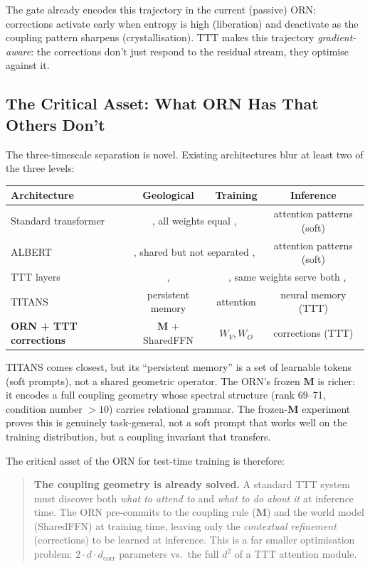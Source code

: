 \documentclass[11pt, a4paper]{article}
\newcommand{\M}{\mathbf{M}}
\theoremstyle{plain}
\theoremstyle{definition}
\theoremstyle{remark}
\begin{document}
The gate already encodes this trajectory in the current (passive) ORN: corrections activate early when entropy is high (liberation) and deactivate as the coupling pattern sharpens (crystallisation).
TTT makes this trajectory \emph{gradient-aware}: the corrections don't just respond to the residual stream, they optimise against it.

\subsection{The Critical Asset: What ORN Has That Others Don't}
\label{sec:critical-asset}

The three-timescale separation is novel.
Existing architectures blur at least two of the three levels:

\begin{center}\small
\begin{tabular}{lccc}
\toprule
\textbf{Architecture} & \textbf{Geological} & \textbf{Training} & \textbf{Inference} \\
\midrule
Standard transformer & \multicolumn{2}{c}{,  all weights equal , } & attention patterns (soft) \\
ALBERT~\cite{dehghani2018universal} & \multicolumn{2}{c}{,  shared but not separated , } & attention patterns (soft) \\
TTT layers~\cite{sun2024ttt} & ,  & \multicolumn{2}{c}{,  same weights serve both , } \\
TITANS~\cite{behrouz2025titans} & persistent memory & attention & neural memory (TTT) \\
\textbf{ORN + TTT corrections} & $\M$ + SharedFFN & $W_V, W_O$ & corrections (TTT) \\
\bottomrule
\end{tabular}
\end{center}

TITANS comes closest, but its ``persistent memory'' is a set of learnable tokens (soft prompts), not a shared geometric operator.
The ORN's frozen $\M$ is richer: it encodes a full coupling geometry whose spectral structure (rank 69--71, condition number $> 10$) carries relational grammar.
The frozen-$\M$ experiment proves this is genuinely task-general, not a soft prompt that works well on the training distribution, but a coupling invariant that transfers.

The critical asset of the ORN for test-time training is therefore:

\begin{quote}
\textbf{The coupling geometry is already solved.}
A standard TTT system must discover both \emph{what to attend to} and \emph{what to do about it} at inference time.
The ORN pre-commits to the coupling rule ($\M$) and the world model (SharedFFN) at training time, leaving only the \emph{contextual refinement} (corrections) to be learned at inference.
This is a far smaller optimisation problem: $2 \cdot d \cdot d_{\mathrm{corr}}$ parameters vs.\ the full $d^2$ of a TTT attention module.
\end{quote}
\end{document}
